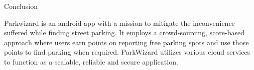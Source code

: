 \documentclass[final]{beamer}
\newlength{\onecolwid}
\begin{document}
\begin{frame}[t]
\begin{columns}[t]
\begin{column}{\onecolwid}

\begin{alertblock}{Conclusion}

Parkwizard is an android app with a mission to mitigate the inconvenience suffered while finding street parking. It employs a crowd-sourcing, score-based approach where users earn points on reporting free parking spots and use those points to find parking when required. ParkWizard utilizes various cloud services to function as a scalable, reliable and secure application.
\end{alertblock}



\end{column} %

\end{columns} %

\end{frame} %
\end{document}
